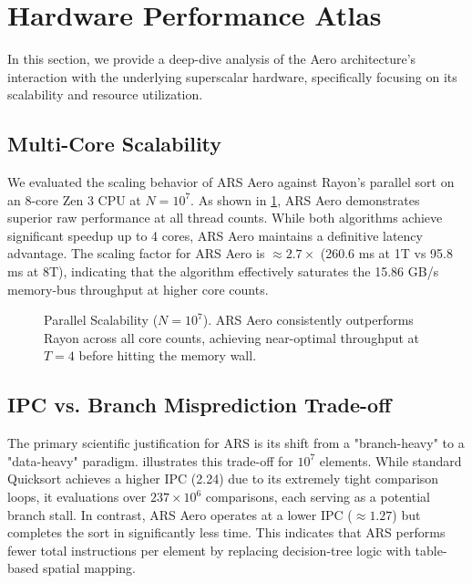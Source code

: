 \section{Hardware Performance Atlas}
In this section, we provide a deep-dive analysis of the Aero architecture's interaction with the underlying superscalar hardware, specifically focusing on its scalability and resource utilization.

\subsection{Multi-Core Scalability}
We evaluated the scaling behavior of ARS Aero against Rayon's parallel sort on an 8-core Zen 3 CPU at $N=10^7$. As shown in \cref{fig:scalability}, ARS Aero demonstrates superior raw performance at all thread counts. While both algorithms achieve significant speedup up to 4 cores, ARS Aero maintains a definitive latency advantage. The scaling factor for ARS Aero is $\approx 2.7\times$ (260.6 ms at 1T vs 95.8 ms at 8T), indicating that the algorithm effectively saturates the 15.86 GB/s memory-bus throughput at higher core counts.

\begin{figure}[htbp]
\centering
{}
\caption{Parallel Scalability ($N=10^7$). ARS Aero consistently outperforms Rayon across all core counts, achieving near-optimal throughput at $T=4$ before hitting the memory wall.}
\label{fig:scalability}
\end{figure}

\subsection{IPC vs. Branch Misprediction Trade-off}
The primary scientific justification for ARS is its shift from a "branch-heavy" to a "data-heavy" paradigm.  illustrates this trade-off for $10^7$ elements. While standard Quicksort achieves a higher IPC (2.24) due to its extremely tight comparison loops, it evaluations over $237\times 10^6$ comparisons, each serving as a potential branch stall. In contrast, ARS Aero operates at a lower IPC ($\approx 1.27$) but completes the sort in significantly less time. This indicates that ARS performs fewer total instructions per element by replacing decision-tree logic with table-based spatial mapping.

